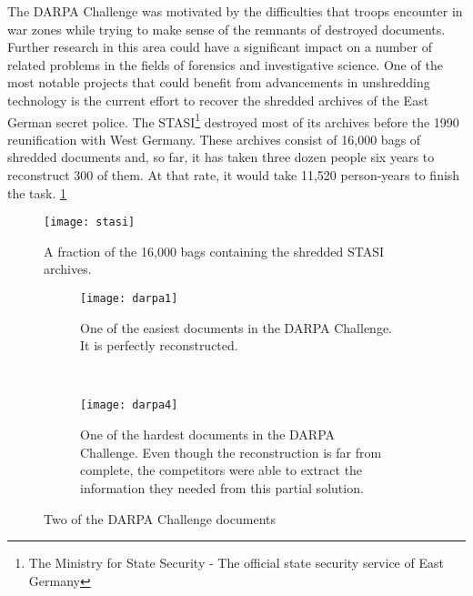 The DARPA Challenge was motivated by the difficulties that troops encounter in war zones while trying to make sense of the remnants of destroyed documents. Further research in this area could  have a significant impact on a number of related problems in the fields of forensics and investigative science. One of the most notable projects that could benefit from advancements in unshredding technology is the  current effort to recover the shredded archives of the East German secret police. The STASI\footnote{The Ministry for State Security - The official state security service of East Germany} destroyed most of its archives before the 1990 reunification with West Germany. These archives consist of 16,000 bags of shredded documents and, so far, it has taken three dozen people six years to reconstruct 300 of them.\cite{P16} At that rate, it would take 11,520 person-years to finish the task. \ref{fig:stasi}

\begin{figure}[H]
    \centering
    \texttt{[image: stasi]}
    \caption{A fraction of the 16,000 bags containing the shredded STASI archives.}
    \label{fig:stasi}
\end{figure}

\begin{figure}[H]
    \centering
    \begin{subfigure}[b]{\textwidth}
        \centering
        \texttt{[image: darpa1]}
        \caption{One of the easiest documents in the DARPA Challenge. It is perfectly reconstructed.}
    \end{subfigure}
    ~
    \begin{subfigure}[b]{\textwidth}
        \centering
        \texttt{[image: darpa4]}
        \caption{One of the hardest documents in the DARPA Challenge. Even though the reconstruction is far from complete, the competitors were able to extract the information they needed from this partial solution.}
    \end{subfigure}
     \caption{Two of the DARPA Challenge documents \cite{P15}}
    \label{fig:darpa}
\end{figure}


